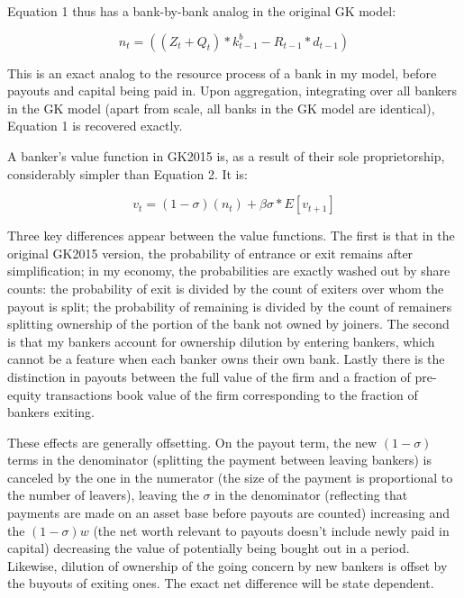 \documentclass[english]{article}
\begin{document}
Equation 1 thus has a bank-by-bank analog in the original GK model:

\begin{equation}n_{t} = \left(\left(Z_t + Q_t\right)*k^b_{t-1} - R_{t-1}*d_{t-1}\right)\end{equation}

This is an exact analog to the resource process of a bank in my model, before payouts and capital 
being paid in. Upon aggregation, integrating over all bankers in the GK model (apart from scale, all 
banks in the GK model are identical), Equation 1 is recovered exactly. 

A banker's value function in GK2015 is, as a result of their sole proprietorship, considerably simpler 
than Equation 2. It is:

\begin{equation}v_{t} =  \left(1-\sigma\right)(n_t ) + \beta\sigma*E\left[v_{t+1}\right]                       \end{equation}

Three key differences appear between the value functions. The first is that in the original GK2015 version, 
the probability of entrance or exit remains after simplification; in my economy, the probabilities are 
exactly washed out by share counts: the probability of exit is divided by the count of exiters over 
whom the payout is split; the probability of remaining is divided by the count of remainers splitting 
ownership of the portion of the bank not owned by joiners. The second is that my bankers account for 
ownership dilution by entering bankers, which cannot be a feature when each banker owns their own 
bank. Lastly there is the distinction in payouts between the full value of the firm and a fraction of 
pre-equity transactions book value of the firm corresponding to the fraction of bankers exiting. 

These effects are generally offsetting. On the payout term, the new $(1-\sigma)$ terms in the denominator 
(splitting the payment between leaving bankers) is canceled by the one in the numerator (the size of 
the payment is proportional to the number of leavers), leaving the $\sigma$ in the denominator (reflecting 
that payments are made on an asset base before payouts are counted) increasing and the $(1-\sigma)w$ 
(the net worth relevant to payouts doesn't include newly paid in capital) decreasing the value of 
potentially being bought out in a period. Likewise, dilution of ownership of the going concern by new 
bankers is offset by the buyouts of exiting ones. The exact net difference will be state dependent. 
\end{document}
